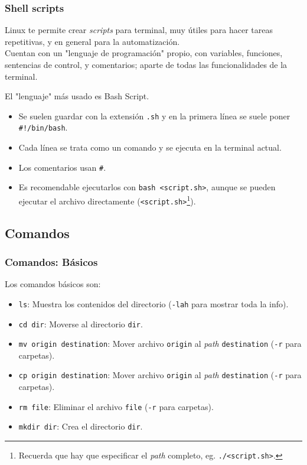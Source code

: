 \documentclass[aspectratio=43]{beamer}
\begin{document}
\begin{frame}
    \frametitle{Shell scripts}
    
    Linux te permite crear \textit{scripts} para terminal, muy útiles para hacer tareas repetitivas, y en general para la automatización.\\
    Cuentan con un "lenguaje de programación" propio, con variables, funciones, sentencias de control, y comentarios; aparte de todas las funcionalidades de la terminal.\newline

    El "lenguaje" más usado es Bash Script.
    \begin{itemize}
        \item Se suelen guardar con la extensión \texttt{.sh} y en la primera línea se suele poner \texttt{\#!/bin/bash}.
        \item Cada línea se trata como un comando y se ejecuta en la terminal actual.
        \item Los comentarios usan \texttt{\#}.
        \item Es recomendable ejecutarlos con \texttt{bash <script.sh>}, aunque se pueden ejecutar el archivo directamente (\texttt{<script.sh>}\footnote{Recuerda que hay que especificar el \textit{path} completo, eg. \texttt{./<script.sh>}.}).
    \end{itemize}

\end{frame}


\subsection{Comandos}

\begin{frame}
    \frametitle{Comandos: Básicos}
    Los comandos básicos son:

    \begin{itemize}
        \item \texttt{ls}: Muestra los contenidos del directorio (\texttt{-lah} para mostrar toda la info).
        \item \texttt{cd dir}: Moverse al directorio \texttt{dir}.
        \item \texttt{mv origin destination}: Mover archivo \texttt{origin} al \textit{path} \texttt{destination} (\texttt{-r} para carpetas).
        \item \texttt{cp origin destination}: Mover archivo \texttt{origin} al \textit{path} \texttt{destination} (\texttt{-r} para carpetas).
        \item \texttt{rm file}: Eliminar el archivo \texttt{file} (\texttt{-r} para carpetas).
        \item \texttt{mkdir dir}: Crea el directorio \texttt{dir}.
    \end{itemize}
\end{frame}
\end{document}
